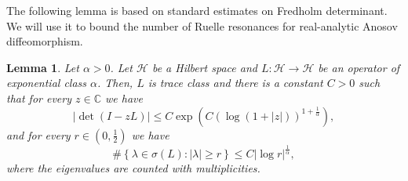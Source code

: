 \documentclass[10pt]{amsart}
\newtheorem{lemm}[theo]{Lemma}\newtheorem{prop}[theo]{Proposition}\newtheorem{coro}[theo]{Corollary}\newtheorem{conj}[theo]{Conjecture}
\theoremstyle{definition}\newtheorem{defi}[theo]{Definition}\newtheorem{rema}[theo]{Remark}\newtheorem{exam}[theo]{Example}\newtheorem{exem}[theo]{Example}\newtheorem{nota}[theo]{Notation}
\newcommand{\set}[1]{\left\{ #1 \right\}}
\newcommand{\p}[1]{\left(#1\right)}
\newcommand{\va}[1]{\left|#1\right|}
\newcommand{\clH}{\mathcal{H}}
\newcommand{\bbC}{\mathbb{C}}
\begin{document}
The following lemma is based on standard estimates on Fredholm determinant. We will use it to bound the number of Ruelle resonances for real-analytic Anosov diffeomorphism.

\begin{lemm}\label{lemma:order_exponential}
Let $\alpha > 0$. Let $\clH$ be a Hilbert space and $L : \clH \to \clH$ be an operator of exponential class $\alpha$. Then, $L$ is trace class and there is a constant $C > 0$ such that for every $z \in \bbC$ we have
\begin{equation*}
\va{\det\p{ I - z L}} \leq C \exp\p{C \p{\log(1 + \va{z})}^{1+ \frac{1}{\alpha}}},
\end{equation*}
and for every $r \in (0,\frac{1}{2})$ we have
\begin{equation}\label{eq:bound_eigenvalues}
\# \set{ \lambda \in \sigma(L) : \va{\lambda} \geq r} \leq C |\log r|^{\frac{1}{\alpha}},
\end{equation}
where the eigenvalues are counted with multiplicities.
\end{lemm}
\end{document}
